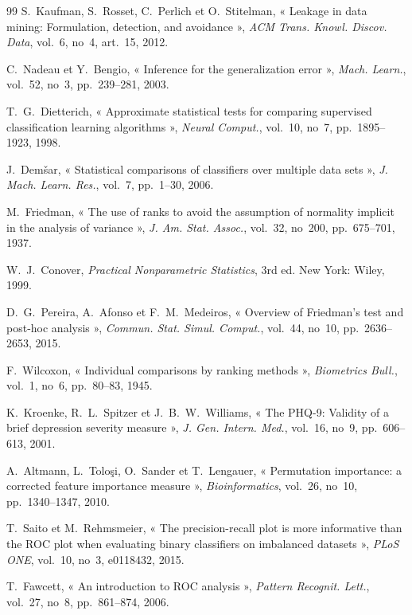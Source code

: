 \begin{thebibliography}{99}
 S.~Kaufman, S.~Rosset, C.~Perlich et O.~Stitelman, « Leakage in data mining: Formulation, detection, and avoidance », \emph{ACM Trans. Knowl. Discov. Data}, vol.~6, no~4, art.~15, 2012.

 C.~Nadeau et Y.~Bengio, « Inference for the generalization error », \emph{Mach. Learn.}, vol.~52, no~3, pp.~239--281, 2003.

 T.~G.~Dietterich, « Approximate statistical tests for comparing supervised classification learning algorithms », \emph{Neural Comput.}, vol.~10, no~7, pp.~1895--1923, 1998.

 J.~Dem\v{s}ar, « Statistical comparisons of classifiers over multiple data sets », \emph{J. Mach. Learn. Res.}, vol.~7, pp.~1--30, 2006.

 M.~Friedman, « The use of ranks to avoid the assumption of normality implicit in the analysis of variance », \emph{J. Am. Stat. Assoc.}, vol.~32, no~200, pp.~675--701, 1937.

 W.~J.~Conover, \emph{Practical Nonparametric Statistics}, 3rd ed. New York: Wiley, 1999.

 D.~G.~Pereira, A.~Afonso et F.~M.~Medeiros, « Overview of Friedman's test and post-hoc analysis », \emph{Commun. Stat. Simul. Comput.}, vol.~44, no~10, pp.~2636--2653, 2015.

 F.~Wilcoxon, « Individual comparisons by ranking methods », \emph{Biometrics Bull.}, vol.~1, no~6, pp.~80--83, 1945.

 K.~Kroenke, R.~L.~Spitzer et J.~B.~W.~Williams, « The PHQ-9: Validity of a brief depression severity measure », \emph{J. Gen. Intern. Med.}, vol.~16, no~9, pp.~606--613, 2001.

 A.~Altmann, L.~Tolo\c{s}i, O.~Sander et T.~Lengauer, « Permutation importance: a corrected feature importance measure », \emph{Bioinformatics}, vol.~26, no~10, pp.~1340--1347, 2010.

 T.~Saito et M.~Rehmsmeier, « The precision-recall plot is more informative than the ROC plot when evaluating binary classifiers on imbalanced datasets », \emph{PLoS ONE}, vol.~10, no~3, e0118432, 2015.

 T.~Fawcett, « An introduction to ROC analysis », \emph{Pattern Recognit. Lett.}, vol.~27, no~8, pp.~861--874, 2006.


\end{thebibliography}

